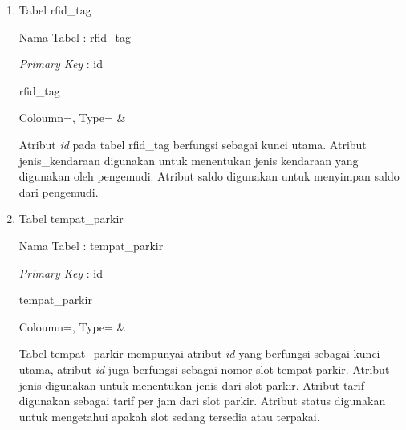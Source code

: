 \begin{enumerate}[topsep=0pt,itemsep=0pt,partopsep=0pt, parsep=0pt]
    \item Tabel rfid\_tag

    Nama Tabel : rfid\_tag

    \textit{Primary Key} : id

    \begin{atable}
        \caption{rfid\_tag}
        \label{table:db_rfid_tag}
            {
                Coloumn=\Coloumn, 
                Type=\Type}
            {
                \Coloumn & 
                \Type}
    \end{atable}

    Atribut \textit{id} pada tabel rfid\_tag berfungsi sebagai kunci utama. Atribut jenis\_kendaraan digunakan untuk menentukan jenis kendaraan yang digunakan oleh pengemudi. Atribut saldo digunakan untuk menyimpan saldo dari pengemudi.

    \item Tabel tempat\_parkir

    Nama Tabel : tempat\_parkir

    \textit{Primary Key} : id

    \begin{table} [H]
        \centering
        \caption{tempat\_parkir}
        \label{table:db_tempat_parkir}
            {
                Coloumn=\Coloumn, 
                Type=\Type}
            {
                \Coloumn & 
                \Type}
    \end{table}

    Tabel tempat\_parkir mempunyai atribut \textit{id} yang berfungsi sebagai kunci utama, atribut \textit{id} juga berfungsi sebagai nomor slot tempat parkir. Atribut jenis digunakan untuk menentukan jenis dari slot parkir. Atribut tarif digunakan sebagai tarif per jam dari slot parkir. Atribut status digunakan untuk mengetahui apakah slot sedang tersedia atau terpakai.


\end{enumerate}
